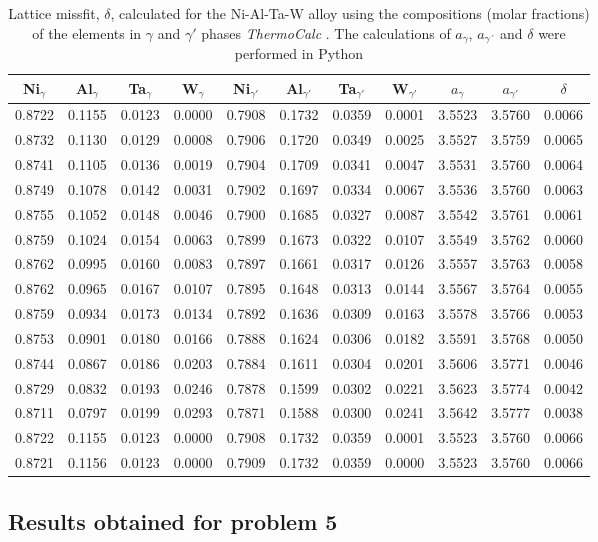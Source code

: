 \begin{table}[H]
    \centering
    \begin{tabular}{rrrrrrrrrrr}
        \multicolumn{1}{c}{Ni$_\gamma$} & \multicolumn{1}{c}{Al$_\gamma$} & \multicolumn{1}{c}{Ta$_\gamma$} & \multicolumn{1}{c}{W$_\gamma$} & \multicolumn{1}{c}{Ni$_{\gamma'}$} & \multicolumn{1}{c}{Al$_{\gamma'}$} & \multicolumn{1}{c}{Ta$_{\gamma'}$} & \multicolumn{1}{c}{W$_{\gamma'}$} & \multicolumn{1}{c}{$a_\gamma$} & \multicolumn{1}{c}{$a_{\gamma'}$} & \multicolumn{1}{c}{$\delta$} \\ \hline \hline
        0.8722 & 0.1155 & 0.0123 & 0.0000 & 0.7908 & 0.1732 & 0.0359 & 0.0001 & 3.5523 & 3.5760 & 0.0066 \\0.8732 & 0.1130 & 0.0129 & 0.0008 & 0.7906 & 0.1720 & 0.0349 & 0.0025 & 3.5527 & 3.5759 & 0.0065 \\0.8741 & 0.1105 & 0.0136 & 0.0019 & 0.7904 & 0.1709 & 0.0341 & 0.0047 & 3.5531 & 3.5760 & 0.0064 \\0.8749 & 0.1078 & 0.0142 & 0.0031 & 0.7902 & 0.1697 & 0.0334 & 0.0067 & 3.5536 & 3.5760 & 0.0063 \\0.8755 & 0.1052 & 0.0148 & 0.0046 & 0.7900 & 0.1685 & 0.0327 & 0.0087 & 3.5542 & 3.5761 & 0.0061 \\0.8759 & 0.1024 & 0.0154 & 0.0063 & 0.7899 & 0.1673 & 0.0322 & 0.0107 & 3.5549 & 3.5762 & 0.0060 \\0.8762 & 0.0995 & 0.0160 & 0.0083 & 0.7897 & 0.1661 & 0.0317 & 0.0126 & 3.5557 & 3.5763 & 0.0058 \\0.8762 & 0.0965 & 0.0167 & 0.0107 & 0.7895 & 0.1648 & 0.0313 & 0.0144 & 3.5567 & 3.5764 & 0.0055 \\0.8759 & 0.0934 & 0.0173 & 0.0134 & 0.7892 & 0.1636 & 0.0309 & 0.0163 & 3.5578 & 3.5766 & 0.0053 \\0.8753 & 0.0901 & 0.0180 & 0.0166 & 0.7888 & 0.1624 & 0.0306 & 0.0182 & 3.5591 & 3.5768 & 0.0050 \\0.8744 & 0.0867 & 0.0186 & 0.0203 & 0.7884 & 0.1611 & 0.0304 & 0.0201 & 3.5606 & 3.5771 & 0.0046 \\0.8729 & 0.0832 & 0.0193 & 0.0246 & 0.7878 & 0.1599 & 0.0302 & 0.0221 & 3.5623 & 3.5774 & 0.0042 \\0.8711 & 0.0797 & 0.0199 & 0.0293 & 0.7871 & 0.1588 & 0.0300 & 0.0241 & 3.5642 & 3.5777 & 0.0038 \\0.8722 & 0.1155 & 0.0123 & 0.0000 & 0.7908 & 0.1732 & 0.0359 & 0.0001 & 3.5523 & 3.5760 & 0.0066 \\0.8721 & 0.1156 & 0.0123 & 0.0000 & 0.7909 & 0.1732 & 0.0359 & 0.0000 & 3.5523 & 3.5760 & 0.0066
    \end{tabular}
    \caption{Lattice missfit, $\delta$, calculated for the Ni-Al-Ta-W alloy using the compositions (molar fractions) of the elements in $\gamma$ and $\gamma'$ phases  \textit{ThermoCalc} \citep{thermocalc}. The calculations of $a_\gamma$, $a_{\gamma´}$ and $\delta$ were performed in Python \citep{mygit}}
    \label{tab:tab07}
\end{table}

\subsection{Results obtained for problem 5}

